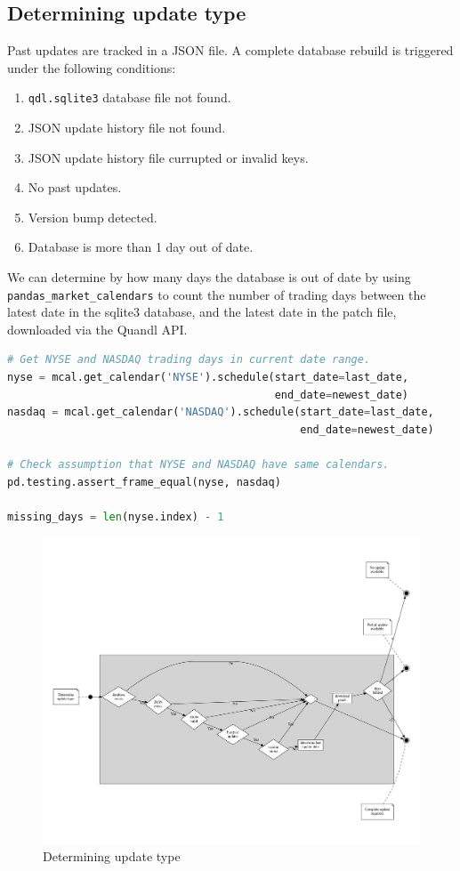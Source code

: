 \documentclass[8pt,oneside]{book}
\begin{document}
\subsection{Determining update type}

Past updates are tracked in a JSON file. A complete database rebuild is triggered under the following conditions:

\begin{enumerate}
    \item \texttt{qdl.sqlite3} database file not found.
    \item JSON update history file not found.
    \item JSON update history file currupted or invalid keys.
    \item No past updates.
    \item Version bump detected.
    \item Database is more than 1 day out of date.
\end{enumerate}

We can determine by how many days the database is out of date by using \texttt{pandas\_market\_calendars} to
count the number of trading days between the latest date in the sqlite3 database, and the latest date in
the patch file, downloaded via the Quandl API.

\begin{lstlisting}[language=Python]
# Get NYSE and NASDAQ trading days in current date range.
nyse = mcal.get_calendar('NYSE').schedule(start_date=last_date,
                                          end_date=newest_date)
nasdaq = mcal.get_calendar('NASDAQ').schedule(start_date=last_date, 
                                              end_date=newest_date)

# Check assumption that NYSE and NASDAQ have same calendars.
pd.testing.assert_frame_equal(nyse, nasdaq)

missing_days = len(nyse.index) - 1
\end{lstlisting}


\begin{figure}
    \center
    \caption{Determining update type}
    \includegraphics[scale=0.3]{update_type}
\end{figure}
\end{document}
